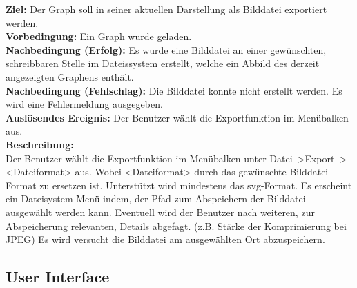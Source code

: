 \label{fa:export_img}
\textbf{Ziel:} Der Graph soll in seiner aktuellen Darstellung als Bilddatei exportiert werden.\\
\textbf{Vorbedingung:} Ein Graph wurde geladen. \\
\textbf{Nachbedingung (Erfolg):} Es wurde eine Bilddatei an einer gewünschten, schreibbaren Stelle im Dateissystem erstellt, welche ein Abbild des derzeit angezeigten Graphens enthält.\\
\textbf{Nachbedingung (Fehlschlag):} Die Bilddatei konnte nicht erstellt werden. Es wird eine Fehlermeldung ausgegeben.\\
\textbf{Auslösendes Ereignis:}
Der Benutzer wählt die Exportfunktion im Menübalken aus.\\
\textbf{Beschreibung:}\\
Der Benutzer wählt die Exportfunktion im Menübalken unter Datei-->Export--><Dateiformat> aus. Wobei <Dateiformat> durch das gewünschte Bilddatei-Format zu ersetzen ist. Unterstützt wird mindestens das \gls{svg}-Format. %
Es erscheint ein Dateisystem-Menü indem, der Pfad zum Abspeichern der Bilddatei ausgewählt werden kann.
Eventuell wird der Benutzer nach weiteren, zur Abspeicherung relevanten, Details abgefagt. (z.B. Stärke der Komprimierung bei JPEG) %
Es wird versucht die Bilddatei am ausgewählten Ort abzuspeichern.\\

\subsection{User Interface}

